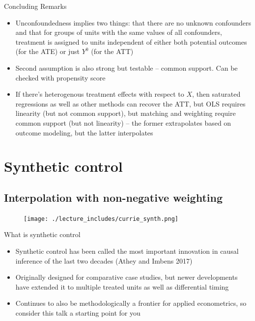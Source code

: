 \documentclass{beamer}
\begin{document}
\begin{frame}{Concluding Remarks}

\begin{itemize}

\item Unconfoundedness implies two things: that there are no unknown confounders and that for groups of units with the same values of all confounders, treatment is assigned to units independent of either both potential outcomes (for the ATE) or just $Y^0$ (for the ATT)
\item Second assumption is also strong but testable -- common support. Can be checked with propensity score
\item If there's heterogenous treatment effects with respect to $X$, then saturated regressions as well as other methods can recover the ATT, but OLS requires linearity (but not common support), but matching and weighting require common support (but not linearity) -- the former extrapolates based on outcome modeling, but the latter interpolates

\end{itemize}

\end{frame}


\section{Synthetic control}
\subsection{Interpolation with non-negative weighting}


\begin{frame}[plain]
	\begin{figure}
	\texttt{[image: ./lecture\_includes/currie\_synth.png]}
	\end{figure}
\end{frame}

\begin{frame}{What is synthetic control}
	
	\begin{itemize}
	\item Synthetic control has been called the most important innovation in causal inference of the last two decades (Athey and Imbens 2017)
	\item Originally designed for comparative case studies, but newer developments have extended it to multiple treated units as well as differential timing
	\item Continues to also be methodologically a frontier for applied econometrics, so consider this talk a starting point for you
	\end{itemize}
\end{frame}
	
\end{document}
